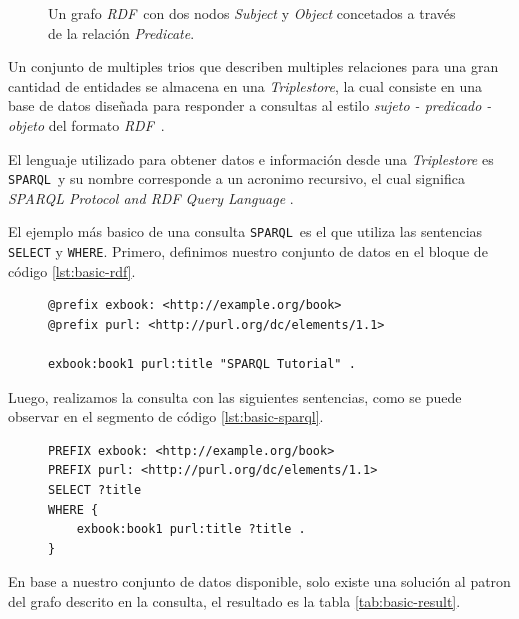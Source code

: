 \documentclass[conference,compsoc]{IEEEtran}
\newcommand{\rdf}{\textit{RDF}\ }
\newcommand{\spql}{\texttt{SPARQL}\ }
\begin{document}
\begin{figure}%
    \centering
    
    \caption{Un grafo \rdf con dos nodos \textit{Subject} y \textit{Object} concetados a través de
    la relación \textit{Predicate}.}
    \label{fig:rdf-graph1}
\end{figure}

Un conjunto de multiples trios que describen multiples relaciones para una gran cantidad
de entidades se almacena en una \textit{Triplestore}, la cual consiste en una base de datos
diseñada para responder a consultas al estilo \textit{sujeto - predicado - objeto} del 
formato \rdf \cite{rusher2001triple}.

El lenguaje utilizado para obtener datos e información desde una \textit{Triplestore} es
\spql y su nombre corresponde a un acronimo recursivo, el cual significa \textit{SPARQL
Protocol and RDF Query Language} \cite{world2013sparql}.

El ejemplo más basico de una consulta \spql es el que utiliza las sentencias \texttt{SELECT}
y \texttt{WHERE}. Primero, definimos nuestro conjunto de datos en el bloque de código \ref{lst:basic-rdf}.

\begin{figure}
    \begin{lstlisting}[captionpos=b, caption=Datos en formato \rdf., label=lst:basic-rdf, basicstyle=\ttfamily,frame=single]
@prefix exbook: <http://example.org/book>
@prefix purl: <http://purl.org/dc/elements/1.1>

exbook:book1 purl:title "SPARQL Tutorial" .
     \end{lstlisting}
\end{figure}

Luego, realizamos la consulta con las siguientes sentencias, como se puede observar en
el segmento de código \ref{lst:basic-sparql}.

\begin{figure}
    \begin{lstlisting}[captionpos=b, caption=Consulta SPARQL basica., label=lst:basic-sparql, basicstyle=\ttfamily,frame=single]
PREFIX exbook: <http://example.org/book>
PREFIX purl: <http://purl.org/dc/elements/1.1>
SELECT ?title
WHERE {
    exbook:book1 purl:title ?title .
}
     \end{lstlisting}
\end{figure}

En base a nuestro conjunto de datos disponible, solo existe una
solución al patron del grafo descrito en la consulta, el resultado es la tabla \ref{tab:basic-result}.
\end{document}
